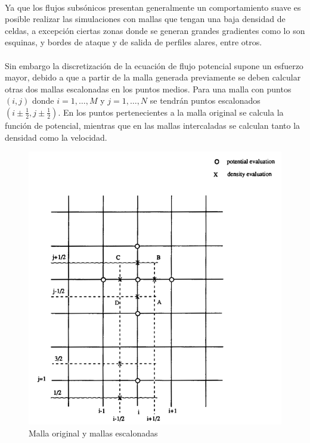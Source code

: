 \documentclass[letterpaper, openright, 12pt]{book}
\begin{document}
    \paragraph*{}
        Ya que los flujos subsónicos presentan generalmente un comportamiento
        suave es posible realizar las simulaciones con mallas que tengan una
        baja densidad de celdas, a excepción ciertas zonas donde se generan
        grandes gradientes como lo son esquinas, y bordes de ataque y de salida
        de perfiles alares, entre otros.

    \paragraph*{}
        Sin embargo la discretización de la ecuación de flujo potencial supone
        un esfuerzo mayor, debido a que a partir de la malla generada
        previamente se deben calcular otras dos mallas escalonadas en los puntos
        medios. Para una malla con puntos $(i, j)$ donde $i = 1, \ldots, M$ y
        $j = 1, \ldots, N$ se tendrán puntos escalonados $(i\pm\frac{1}{2}, j
        \pm\frac{1}{2})$. En los puntos pertenecientes a la malla original se 
        calcula la función de potencial, mientras que en las mallas intercaladas
        se calculan tanto la densidad como la velocidad.

        \begin{figure}[htbp!]
            \centering
            \includegraphics[keepaspectratio,
                width=115mm]{./img/malla_escalonada}
            \caption[Malla original y mallas escalonadas]{Malla original y
                mallas escalonadas\cite{potential_flow}}
            \label{malla_escalonada}
        \end{figure}
\end{document}
